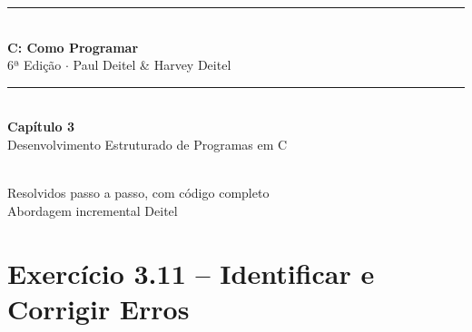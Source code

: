 \documentclass[12pt,a4paper]{article}
\begin{document}
\begin{titlepage}
  \centering\vspace*{2cm}
  {\color{deitelblue}\rule{\linewidth}{2pt}}\\[0.4cm]
  {\huge\bfseries\color{deitelblue}C: Como Programar}\\[0.2cm]
  {\large\color{deitelblue}6ª Edição $\cdot$ Paul Deitel \& Harvey Deitel}\\[0.2cm]
  {\color{deitelblue}\rule{\linewidth}{2pt}}\\[1cm]
  {\LARGE\bfseries Capítulo 3}\\[0.3cm]
  {\Large\color{deitelblue!80}Desenvolvimento Estruturado de Programas em C}\\[0.8cm]
  \begin{tcolorbox}[colback=deitellightblue,colframe=deitelblue,width=0.85\linewidth]
    \\[0.2cm]
    {\normalsize Resolvidos passo a passo, com código completo\\
    Abordagem incremental Deitel}
  \end{tcolorbox}
\end{titlepage}

\tableofcontents\newpage

\section{Exercício 3.11 -- Identificar e Corrigir Erros}
\end{document}
